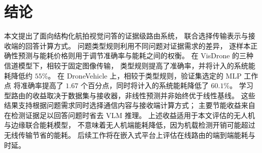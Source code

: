\section{结论}\label{sec:conc}
本文提出了面向结构化航拍视觉问答的证据级路由系统，
联合选择传输表示与接收端的回答计算方式。
问题类型规则利用不同问题对证据需求的差异，
逐样本正确性预测与能耗价格则用于调节准确率与能耗之间的权衡。
在 VisDrone 的三种信道模型下，相较于固定图像传输，
类型规则提高了准确率，并将计入的系统能耗降低约 $55\%$。
在 DroneVehicle 上，相较于类型规则，验证集选定的 MLP 工作点
将准确率提高了 $1.67$ 个百分点，同时将计入的系统能耗降低了 $60.1\%$。
学习型路由的收益取决于数据集与接收器，非线性预测并非始终优于线性基线。
这些结果支持根据问题需求同时选择通信内容与接收端计算方式；
主要节能收益来自在检测证据足以回答问题时省去 VLM 推理。
上述收益适用于本文评估的无人机与边缘联合能耗模型，
不意味着无人机端能耗降低，因为机载检测开销可能超过无线传输节省的能耗。
后续工作将在嵌入式平台上评估在线路由的端到端能耗与时延。
